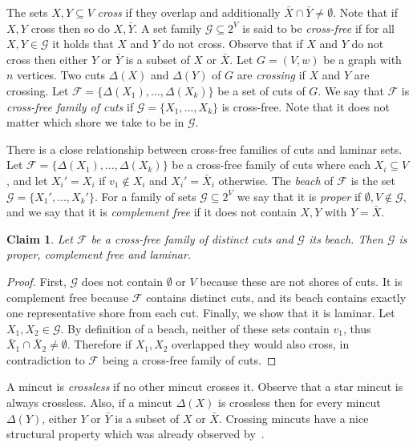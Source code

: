 \documentclass[10pt,a4paper]{article}
\newcommand{\Fcal}{\mathcal{F}}
\newcommand{\Gcal}{\mathcal{G}}
\newcommand{\1}{\mathbf{1}}
\newtheorem{claim}[theorem]{Claim}
\theoremstyle{definition}
\begin{document}
The sets $X,Y \subseteq V$ \emph{cross} if they overlap and additionally $\bar{X} \cap \bar{Y} \ne \emptyset$.
Note that if $X,Y$ cross then so do $X,\bar{Y}$. A set family $\Gcal \subseteq 2^{V}$ is said to be {\em cross-free} if for all $X,Y \in \Gcal$ it holds
that $X$ and $Y$ do not cross. Observe that if $X$ and $Y$ do not cross
then either $Y$ or $\bar{Y}$ is a subset of $X$ or $\bar{X}$.
Let $G = (V,w)$ be a graph with $n$ vertices.
Two cuts $\Delta(X)$ and $\Delta(Y)$ of $G$ are {\em crossing} if $X$ and $Y$ are crossing.
Let $\Fcal = \{ \Delta(X_1), \ldots,  \Delta(X_k) \}$ be a set of cuts of $G$.
We say that $\Fcal$ is {\em cross-free family of cuts} if
$\Gcal = \{X_1, \ldots, X_k\}$ is cross-free.  Note that it does not matter which shore we take to be in $\Gcal$.

There is a close relationship between cross-free families of cuts and laminar sets.
Let $\Fcal = \{ \Delta(X_1), \ldots,  \Delta(X_k) \}$ be a cross-free family of cuts where each $X_i \subseteq V$,
and let $X_i' = X_i$ if $v_1 \not \in X_i$ and $X_i' = \bar{X}_i$ otherwise.
The \emph{beach} of $\Fcal$ is the set $\Gcal = \{X_1', \ldots, X_k'\}$.
For a family of sets $\Gcal \subseteq 2^{V}$ we say that it is \emph{proper} if $\emptyset, V \not \in \Gcal$,
and we say that it is \emph{complement free} if it does not contain $X,Y$ with $Y = \bar{X}$.

\begin{claim}\label{claim:cross-free}
Let $\Fcal$ be a cross-free family of distinct cuts and $\Gcal$ its beach.  Then $\Gcal$ is proper, complement free and laminar.
\end{claim}

\begin{proof}
First, $\Gcal$ does not contain $\emptyset$ or $V$ because these are not shores of cuts.  It is complement free because $\Fcal$ contains
distinct cuts, and its beach contains exactly one representative shore from each cut.  Finally, we show that it is laminar.  Let
$X_1, X_2 \in \Gcal$.  By definition of a beach, neither of these sets contain $v_1$, thus $\bar{X}_1 \cap \bar{X}_2 \ne \emptyset$.  Therefore if
$X_1, X_2$ overlapped they would also cross, in contradiction to $\Fcal$ being a cross-free family of cuts.
\end{proof}

A mincut is {\em crossless} if no other
mincut crosses it. Observe that a star mincut is always crossless.
Also, if a  mincut $\Delta(X)$ is crossless then
for every mincut $\Delta(Y)$, either $Y$ or $\bar{Y}$ is a subset of $X$ or $\bar{X}$.
Crossing mincuts have a nice structural property which was already observed by~\cite{DKL76}.
\end{document}
